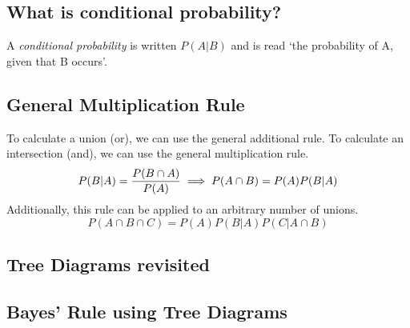 \subsection{What is conditional probability?}  %
A \emph{conditional probability} is written $P(A\vert B)$ and is read `the probability of A, given that B occurs'.

\subsection{General Multiplication Rule}  %
To calculate a union (or), we can use the general additional rule. To calculate an intersection (and), we can use the general multiplication rule.
\begin{equation}
    P(B\vert A)=\frac{P(B\cap A)}{P(A)} \implies P(A\cap B) = P(A)P(B\vert A) \\
\end{equation}
Additionally, this rule can be applied to an arbitrary number of unions.
\begin{equation}
    P(A\cap B\cap C)=P(A)P(B\vert A)P(C\vert A\cap B)
\end{equation}
\subsection{Tree Diagrams revisited}  %
\subsection{Bayes' Rule using Tree Diagrams}  %
